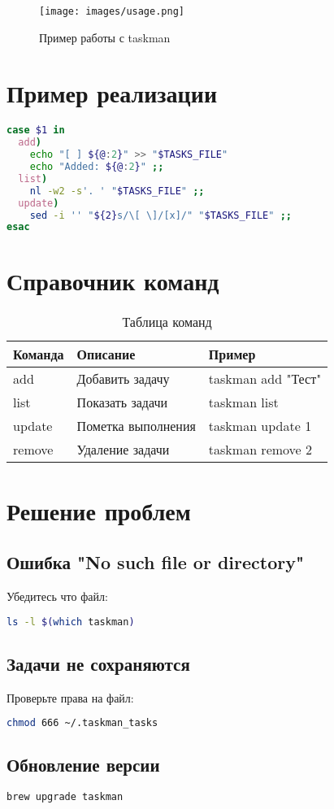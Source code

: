 \documentclass[a4paper,12pt]{article}
\begin{document}
\begin{figure}[h]
  \centering
  \texttt{[image: images/usage.png]}
  \caption{Пример работы с taskman}
  \label{fig:usage}
  \end{figure}

\section{Пример реализации}
\begin{lstlisting}[language=bash, caption=Фрагмент скрипта taskman]
case $1 in
  add)
    echo "[ ] ${@:2}" >> "$TASKS_FILE"
    echo "Added: ${@:2}" ;;
  list)
    nl -w2 -s'. ' "$TASKS_FILE" ;;
  update)
    sed -i '' "${2}s/\[ \]/[x]/" "$TASKS_FILE" ;;
esac
\end{lstlisting}

\section{Справочник команд}
\begin{table}[h]
\centering
\begin{tabular}{|l|l|l|}
\hline
\textbf{Команда} & \textbf{Описание} & \textbf{Пример} \\
\hline
add & Добавить задачу & taskman add "Тест" \\
list & Показать задачи & taskman list \\
update & Пометка выполнения & taskman update 1 \\
remove & Удаление задачи & taskman remove 2 \\
\hline
\end{tabular}
\caption{Таблица команд}
\end{table}

\section{Решение проблем}
\subsection{Ошибка "No such file or directory"}
Убедитесь что файл:
\begin{lstlisting}[language=bash]
ls -l $(which taskman)
\end{lstlisting}

\subsection{Задачи не сохраняются}
Проверьте права на файл:
\begin{lstlisting}[language=bash]
chmod 666 ~/.taskman_tasks
\end{lstlisting}

\subsection{Обновление версии}
\begin{lstlisting}[language=bash]
brew upgrade taskman
\end{lstlisting}
\end{document}
